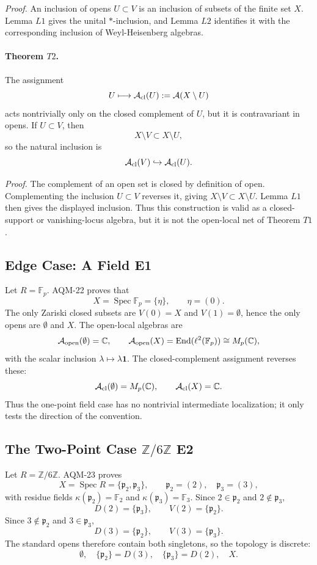 \emph{Proof.}
An inclusion of opens \(U\subset V\) is an inclusion of subsets of the finite
set \(X\).  Lemma \(L1\) gives the unital \(*\)-inclusion, and Lemma \(L2\)
identifies it with the corresponding inclusion of Weyl-Heisenberg algebras.

\paragraph{Theorem \(T2\).}
The assignment
\[
  U\longmapsto\mathcal A_{\rm cl}(U):=\mathcal A(X\setminus U)
\]
acts nontrivially only on the closed complement of \(U\), but it is
contravariant in opens.  If \(U\subset V\), then
\[
  X\setminus V\subset X\setminus U,
\]
so the natural inclusion is
\[
  \mathcal A_{\rm cl}(V)\hookrightarrow\mathcal A_{\rm cl}(U).
\]

\emph{Proof.}
The complement of an open set is closed by definition of open.  Complementing
the inclusion \(U\subset V\) reverses it, giving
\(X\setminus V\subset X\setminus U\).  Lemma \(L1\) then gives the displayed
inclusion.  Thus this construction is valid as a closed-support or
vanishing-locus algebra, but it is not the open-local net of Theorem \(T1\).

\subsection{Edge Case: A Field E1}

Let \(R=\mathbb F_p\).  AQM-22 proves that
\[
  X=\operatorname{Spec}\mathbb F_p=\{\eta\},\qquad \eta=(0).
\]
The only Zariski closed subsets are \(V(0)=X\) and \(V(1)=\emptyset\), hence
the only opens are \(\emptyset\) and \(X\).  The open-local algebras are
\[
  \mathcal A_{\rm open}(\emptyset)=\mathbb C,\qquad
  \mathcal A_{\rm open}(X)=\operatorname{End}(\ell^2(\mathbb F_p))
  \cong M_p(\mathbb C),
\]
with the scalar inclusion \(\lambda\mapsto\lambda\mathbf 1\).  The
closed-complement assignment reverses these:
\[
  \mathcal A_{\rm cl}(\emptyset)=M_p(\mathbb C),\qquad
  \mathcal A_{\rm cl}(X)=\mathbb C.
\]
Thus the one-point field case has no nontrivial intermediate localization;
it only tests the direction of the convention.

\subsection[The Two-Point Case Z/6Z E2]{The Two-Point Case \(\mathbb Z/6\mathbb Z\) E2}

Let \(R=\mathbb Z/6\mathbb Z\).  AQM-23 proves
\[
  X=\operatorname{Spec}R=\{\mathfrak p_2,\mathfrak p_3\},\qquad
  \mathfrak p_2=(2),\quad \mathfrak p_3=(3),
\]
with residue fields \(\kappa(\mathfrak p_2)=\mathbb F_2\) and
\(\kappa(\mathfrak p_3)=\mathbb F_3\).  Since \(2\in\mathfrak p_2\) and
\(2\notin\mathfrak p_3\),
\[
  D(2)=\{\mathfrak p_3\},\qquad V(2)=\{\mathfrak p_2\}.
\]
Since \(3\notin\mathfrak p_2\) and \(3\in\mathfrak p_3\),
\[
  D(3)=\{\mathfrak p_2\},\qquad V(3)=\{\mathfrak p_3\}.
\]
The standard opens therefore contain both singletons, so the topology is
discrete:
\[
  \emptyset,\quad \{\mathfrak p_2\}=D(3),\quad
  \{\mathfrak p_3\}=D(2),\quad X.
\]

